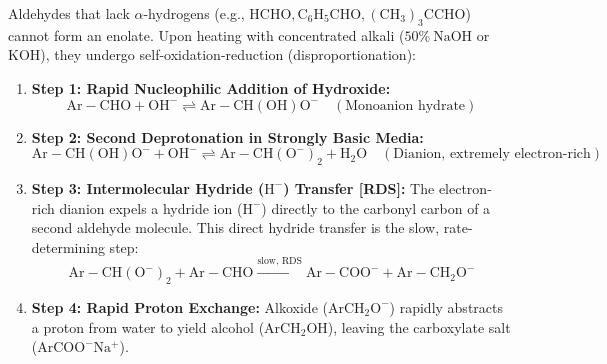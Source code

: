 \documentclass[10pt,a4paper]{article}
\begin{document}
\begin{conceptbox}
Aldehydes that lack $\alpha$-hydrogens (e.g., $\mathrm{HCHO, C_6H_5CHO, (CH_3)_3CCHO}$) cannot form an enolate. Upon heating with concentrated alkali ($50\% \ \mathrm{NaOH}$ or $\mathrm{KOH}$), they undergo self-oxidation-reduction (disproportionation):
\begin{enumerate}[leftmargin=*]
  \item \textbf{Step 1: Rapid Nucleophilic Addition of Hydroxide:}
  \begin{equation}
    \mathrm{Ar-CHO} + \mathrm{OH^-} \rightleftharpoons \mathrm{Ar-CH(OH)O^-} \quad (\text{Monoanion hydrate})
  \end{equation}
  \item \textbf{Step 2: Second Deprotonation in Strongly Basic Media:}
  \begin{equation}
    \mathrm{Ar-CH(OH)O^-} + \mathrm{OH^-} \rightleftharpoons \mathrm{Ar-CH(O^-)_2} + \mathrm{H_2O} \quad (\text{Dianion, extremely electron-rich})
  \end{equation}
  \item \textbf{Step 3: Intermolecular Hydride ($\mathrm{H^-}$) Transfer [RDS]:}
  The electron-rich dianion expels a hydride ion ($\mathrm{H^-}$) directly to the carbonyl carbon of a second aldehyde molecule. This direct hydride transfer is the slow, rate-determining step:
  \begin{equation}
    \mathrm{Ar-CH(O^-)_2} + \mathrm{Ar-CHO} \xrightarrow{\text{slow, RDS}} \mathrm{Ar-COO^-} + \mathrm{Ar-CH_2O^-}
  \end{equation}
  \item \textbf{Step 4: Rapid Proton Exchange:}
  Alkoxide ($\mathrm{ArCH_2O^-}$) rapidly abstracts a proton from water to yield alcohol ($\mathrm{ArCH_2OH}$), leaving the carboxylate salt ($\mathrm{ArCOO^-Na^+}$).
\end{enumerate}
\end{conceptbox}
\end{document}
